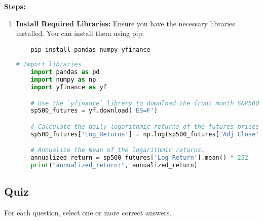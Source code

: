 \documentclass{article}
\begin{document}
\textbf{Steps:}

\begin{enumerate}
    \item \textbf{Install Required Libraries:} Ensure you have the necessary libraries installed. You can install them using pip:
    \begin{verbatim}
    pip install pandas numpy yfinance
    \end{verbatim}

    \begin{lstlisting}[language=Python]
    # Import libraries
    import pandas as pd
    import numpy as np
    import yfinance as yf

    # Use the `yfinance` library to download the front month S&P500 futures price data.
    sp500_futures = yf.download('ES=F')

    # Calculate the daily logarithmic returns of the futures prices.
    sp500_futures['Log_Returns'] = np.log(sp500_futures['Adj Close'] / sp500_futures['Adj Close'].shift(1))

    # Annualize the mean of the logarithmic returns.
    annualized_return = sp500_futures['Log_Return'].mean() * 252
    print("annualized_return:", annualized_return)
    \end{lstlisting}
\end{enumerate}


\subsection{Quiz}
For each question, select one or more correct answers.
\end{document}
